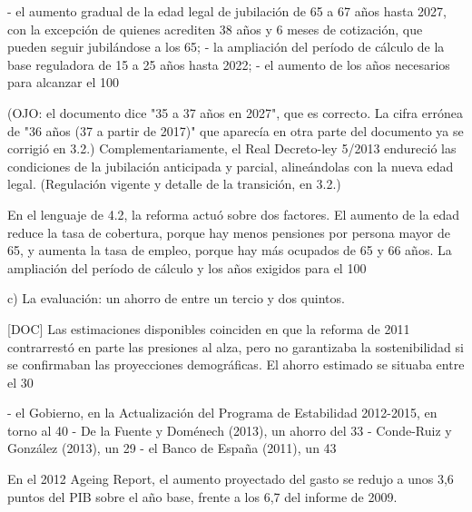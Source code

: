 \documentclass[10pt,a4paper]{article}
\begin{document}
- el aumento gradual de la edad legal de jubilación de 65 a 67 años hasta 2027, con la excepción de quienes acrediten 38 años y 6 meses de cotización, que pueden seguir jubilándose a los 65;
- la ampliación del período de cálculo de la base reguladora de 15 a 25 años hasta 2022;
- el aumento de los años necesarios para alcanzar el 100%

(OJO: el documento dice "35 a 37 años en 2027", que es correcto. La cifra errónea de "36 años (37 a partir de 2017)" que aparecía en otra parte del documento ya se corrigió en 3.2.) Complementariamente, el Real Decreto-ley 5/2013 endureció las condiciones de la jubilación anticipada y parcial, alineándolas con la nueva edad legal. (Regulación vigente y detalle de la transición, en 3.2.)

En el lenguaje de 4.2, la reforma actuó sobre dos factores. El aumento de la edad reduce la tasa de cobertura, porque hay menos pensiones por persona mayor de 65, y aumenta la tasa de empleo, porque hay más ocupados de 65 y 66 años. La ampliación del período de cálculo y los años exigidos para el 100%

c) La evaluación: un ahorro de entre un tercio y dos quintos.

[DOC] Las estimaciones disponibles coinciden en que la reforma de 2011 contrarrestó en parte las presiones al alza, pero no garantizaba la sostenibilidad si se confirmaban las proyecciones demográficas. El ahorro estimado se situaba entre el 30%

- el Gobierno, en la Actualización del Programa de Estabilidad 2012-2015, en torno al 40%
- De la Fuente y Doménech (2013), un ahorro del 33%
- Conde-Ruiz y González (2013), un 29%
- el Banco de España (2011), un 43%

En el 2012 Ageing Report, el aumento proyectado del gasto se redujo a unos 3,6 puntos del PIB sobre el año base, frente a los 6,7 del informe de 2009.
\end{document}
